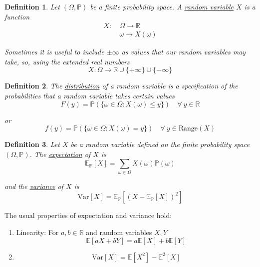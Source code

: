 \documentclass[12pt]{article}
\newtheorem{definition}{Definition}
\newlength\tindent
\renewcommand{\indent}{\hspace*{\tindent}}
\newcommand{\R}{\mathbb R}
\renewcommand{\P}{\mathbb P}
\newcommand{\E}{\mathbb E}
\newcommand{\var}{\mathrm{Var}}
\begin{document}
\begin{definition} Let $(\Omega, \P)$ be a finite probability space. A \underline{random variable} $X$ is a function
\begin{align*}
	X: ~&\Omega \to \R \\
	&\omega \to X(\omega)
\end{align*}

\indent Sometimes it is useful to include $\pm\infty$ as values that our random variables may take, so, using the extended real numbers
\begin{equation*}
	X : \Omega \to \R \cup \{+\infty\} \cup \{-\infty\}
\end{equation*}
\end{definition}

\begin{definition} The \underline{distribution} of a random variable is a specification of the probabilities that a random variable takes certain values
\begin{equation*}
	F(y) = \P(\{\omega \in \Omega : X(\omega) \leq y\}) \quad \forall~y\in\R
\end{equation*}

or
\begin{equation*}
	f(y) = \P(\{\omega\in\Omega: X(\omega) = y\}) \quad \forall~y\in\text{Range}(X)
\end{equation*}
\end{definition}

\begin{definition} Let $X$ be a random variable defined on the finite probability space $(\Omega,\P)$. The \underline{expectation} of $X$ is
\begin{equation*}
	\E_\P[X] = \sum_{\omega\in\Omega} X(\omega)\P(\omega)
\end{equation*}

and the \underline{variance} of $X$ is
\begin{equation*}
	\var[X] = \E_\P[(X - \E_\P[X])^2]
\end{equation*}
\end{definition}

The usual properties of expectation and variance hold:
\begin{enumerate}
	\item Linearity: For $a, b\in\R$ and random variables $X, Y$
	\begin{equation*}
		\E[aX + bY] = a\E[X] + b\E[Y]
	\end{equation*}
	\item 
	\begin{equation*}
		\var[X] = \E[X^2] - \E^2[X]
	\end{equation*}
\end{enumerate}
\end{document}
